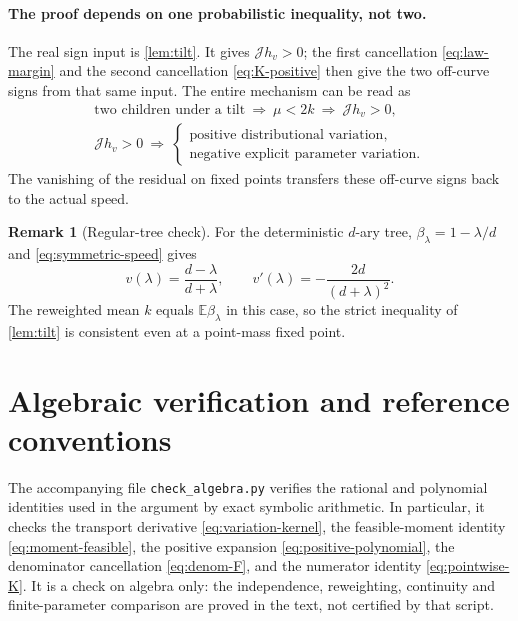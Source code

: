\documentclass[11pt,a4paper]{article}
\numberwithin{equation}{section}
\theoremstyle{notethm}
\theoremstyle{definition}
\newtheorem{remark}[remark]{Remark}
\newcommand{\E}{\mathbb E}
\newcommand{\cJ}{\mathcal J}
\begin{document}
\paragraph{The proof depends on one probabilistic inequality, not two.}
The real sign input is \cref{lem:tilt}. It gives $\cJ h_v>0$; the first
cancellation \eqref{eq:law-margin} and the second cancellation
\eqref{eq:K-positive} then give the two off-curve signs from that same input.
The entire mechanism can be read as
\[
 \begin{gathered}
 \text{two children under a tilt}
 \ \Longrightarrow\ \mu<2k
 \ \Longrightarrow\ \cJ h_v>0,\\[0.4em]
 \cJ h_v>0\ \Longrightarrow\
 \begin{cases}
   \text{positive distributional variation},\\
   \text{negative explicit parameter variation}.
 \end{cases}
 \end{gathered}
\]
The vanishing of the residual on fixed points transfers these off-curve
signs back to the actual speed.

\begin{remark}[Regular-tree check]\label{rem:regular}
For the deterministic $d$-ary tree, $\beta_\lambda=1-\lambda/d$ and
\eqref{eq:symmetric-speed} gives
\[
 v(\lambda)=\frac{d-\lambda}{d+\lambda},\qquad
 v'(\lambda)=-\frac{2d}{(d+\lambda)^2}.
\]
The reweighted mean $k$ equals $\E\beta_\lambda$ in this case, so the strict
inequality of \cref{lem:tilt} is consistent even at a point-mass fixed point.
\end{remark}

\appendix
\section{Algebraic verification and reference conventions}\label{sec:appendix}

The accompanying file \texttt{check\_algebra.py} verifies the rational and
polynomial identities used in the argument by exact symbolic arithmetic.
In particular, it checks the transport derivative
\eqref{eq:variation-kernel}, the feasible-moment identity
\eqref{eq:moment-feasible}, the positive expansion
\eqref{eq:positive-polynomial}, the denominator cancellation
\eqref{eq:denom-F}, and the numerator identity \eqref{eq:pointwise-K}.
It is a check on algebra only: the independence, reweighting, continuity and
finite-parameter comparison are proved in the text, not certified by that
script.
\end{document}
